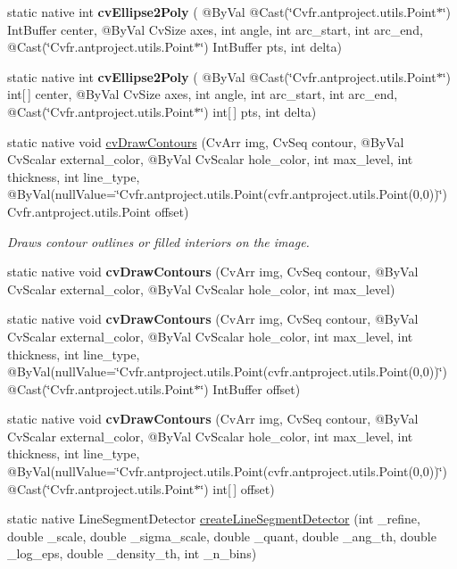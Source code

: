 \begin{DoxyCompactItemize}
static native int {\bfseries cv\+Ellipse2\+Poly} ( @By\+Val @Cast(\char`\"{}Cv\+fr.antproject.utils.Point$\ast$\char`\"{}) Int\+Buffer center, @By\+Val Cv\+Size axes, int angle, int arc\+\_\+start, int arc\+\_\+end, @Cast(\char`\"{}Cv\+fr.antproject.utils.Point$\ast$\char`\"{}) Int\+Buffer pts, int delta)
\item 
static native int {\bfseries cv\+Ellipse2\+Poly} ( @By\+Val @Cast(\char`\"{}Cv\+fr.antproject.utils.Point$\ast$\char`\"{}) int\mbox{[}$\,$\mbox{]} center, @By\+Val Cv\+Size axes, int angle, int arc\+\_\+start, int arc\+\_\+end, @Cast(\char`\"{}Cv\+fr.antproject.utils.Point$\ast$\char`\"{}) int\mbox{[}$\,$\mbox{]} pts, int delta)
\item 
static native void \hyperlink{group__imgproc__c_ga225fad4fc8d41e9c4235b5b6e11de7c9}{cv\+Draw\+Contours} (Cv\+Arr img, Cv\+Seq contour, @By\+Val Cv\+Scalar external\+\_\+color, @By\+Val Cv\+Scalar hole\+\_\+color, int max\+\_\+level, int thickness, int line\+\_\+type, @By\+Val(null\+Value=\char`\"{}Cv\+fr.antproject.utils.Point(cv\+fr.antproject.utils.Point(0,0))\char`\"{}) Cv\+fr.antproject.utils.Point offset)
\begin{DoxyCompactList}\small\item\em Draws contour outlines or filled interiors on the image. \end{DoxyCompactList}\item 
static native void {\bfseries cv\+Draw\+Contours} (Cv\+Arr img, Cv\+Seq contour, @By\+Val Cv\+Scalar external\+\_\+color, @By\+Val Cv\+Scalar hole\+\_\+color, int max\+\_\+level)
\item 
static native void {\bfseries cv\+Draw\+Contours} (Cv\+Arr img, Cv\+Seq contour, @By\+Val Cv\+Scalar external\+\_\+color, @By\+Val Cv\+Scalar hole\+\_\+color, int max\+\_\+level, int thickness, int line\+\_\+type, @By\+Val(null\+Value=\char`\"{}Cv\+fr.antproject.utils.Point(cv\+fr.antproject.utils.Point(0,0))\char`\"{}) @Cast(\char`\"{}Cv\+fr.antproject.utils.Point$\ast$\char`\"{}) Int\+Buffer offset)
\item 
static native void {\bfseries cv\+Draw\+Contours} (Cv\+Arr img, Cv\+Seq contour, @By\+Val Cv\+Scalar external\+\_\+color, @By\+Val Cv\+Scalar hole\+\_\+color, int max\+\_\+level, int thickness, int line\+\_\+type, @By\+Val(null\+Value=\char`\"{}Cv\+fr.antproject.utils.Point(cv\+fr.antproject.utils.Point(0,0))\char`\"{}) @Cast(\char`\"{}Cv\+fr.antproject.utils.Point$\ast$\char`\"{}) int\mbox{[}$\,$\mbox{]} offset)
\item 
static native Line\+Segment\+Detector \hyperlink{group__imgproc__feature_ga19a371ab2269ddf309820d928394498d}{create\+Line\+Segment\+Detector} (int \+\_\+refine, double \+\_\+scale, double \+\_\+sigma\+\_\+scale, double \+\_\+quant, double \+\_\+ang\+\_\+th, double \+\_\+log\+\_\+eps, double \+\_\+density\+\_\+th, int \+\_\+n\+\_\+bins)

\end{DoxyCompactItemize}
